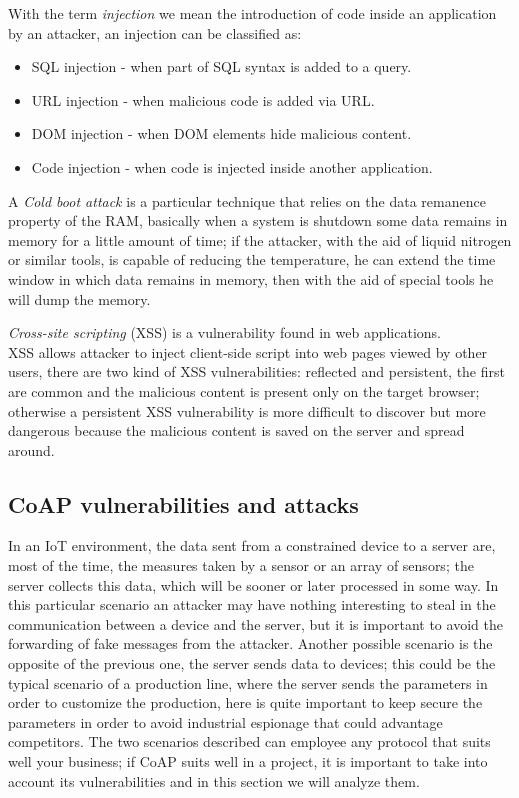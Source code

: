 	With the term \emph{injection} we mean the introduction of code inside an application by an attacker, an injection
	can be classified as:
	\begin{itemize}
		\item SQL injection - when part of SQL syntax is added to a query.
		\item URL injection - when malicious code is added via URL.
		\item DOM injection - when DOM elements hide malicious content.
		\item Code injection - when code is injected inside another application.
	\end{itemize}
	
	A \emph{Cold boot attack} is a particular technique that relies on the data remanence property of the RAM, basically when
	a system is shutdown some data remains in memory for a little amount of time; if the attacker, with the aid of liquid nitrogen or similar tools, is capable of reducing the temperature, he can extend the time window in which data remains in memory, then with the aid of special tools he will dump the memory.\newline
	
	\emph{Cross-site scripting} (XSS) is a vulnerability found in web applications.\\
	XSS allows attacker to inject client-side script into web pages viewed by other users, there are two kind of XSS vulnerabilities:
	reflected and persistent, the first are common and the malicious content is present only on the target browser; otherwise a persistent XSS vulnerability is more difficult to discover but more dangerous because the malicious content is saved on the server and spread around.\\
	
	
	\subsection{CoAP vulnerabilities and attacks}
	In an IoT environment, the data sent from a constrained device to a server are, most of the time, the measures taken by a sensor or an array of sensors; the server collects this data, which will be sooner or later processed in some way.\newline
	In this particular scenario an attacker may have nothing interesting to steal in the communication between a device and the server, but it is important to avoid the forwarding of fake messages from the attacker.\newline
	Another possible scenario is the opposite of the previous one, the server sends data to devices; this could be the typical scenario of a production line, where the server sends the parameters in order to customize the production, here is quite important to keep secure the parameters in order to avoid industrial espionage that could advantage competitors.\newline
	The two scenarios described can employee any protocol that suits well your business; if CoAP suits well in a project, it is important to take into account its vulnerabilities and in this section we will analyze them.\newline
	
